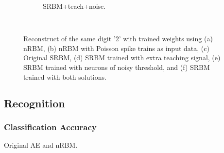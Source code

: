 \begin{figure}
\begin{subfigure}[t]{0.32\textwidth}
		\caption{SRBM+teach+noise.}
	\end{subfigure}\\
	\caption{Reconstruct of the same digit '2' with trained weights using (a) nRBM, (b) nRBM with Poisson spike trains as input data, (c) Original SRBM, (d) SRBM trained with extra teaching signal, (e) SRBM trained with neurons of noisy threshold, and (f) SRBM trained with both solutions.}
\end{figure}

\subsection{Recognition}
\subsubsection{Classification Accuracy}
Original AE and nRBM.

